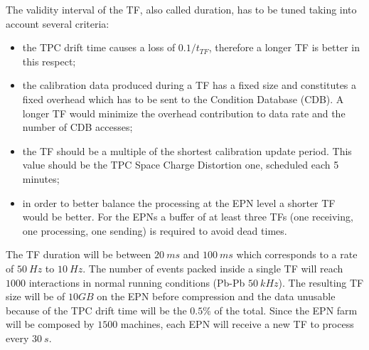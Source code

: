 The validity interval of the TF, also called duration, has to be tuned taking into account several criteria:
\begin{itemize}
    \item the TPC drift time causes a loss of $0.1/t_{TF}$, therefore a longer TF is better in this respect;
    \item the calibration data produced during a TF has a fixed size and constitutes a fixed overhead which has to be sent to the Condition Database (CDB). A longer TF would minimize the overhead contribution to data rate and the number of CDB accesses;
    \item the TF should be a multiple of the shortest calibration update period. This value should be the TPC Space Charge Distortion one, scheduled each 5 minutes;
    \item in order to better balance the processing at the EPN level a shorter TF would be better. For the EPNs a buffer of at least three TFs (one receiving, one processing, one sending) is required to avoid dead times.
\end{itemize}
The TF duration will be between $20\ ms$ and $100\ ms$ which corresponds to a rate of $50\ Hz$ to $10\ Hz$.
The number of events packed inside a single TF will reach $1000$ interactions in normal running conditions (Pb-Pb $50\ kHz$).
The resulting TF size will be of $10GB$ on the EPN before compression and the data unusable because of the TPC drift time will be the $0.5\%$ of the total.
Since the EPN farm will be composed by $1500$ machines, each EPN will receive a new TF to process every $30\ s$.

